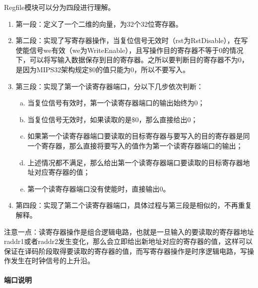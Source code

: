 Regfile模块可以分为四段进行理解。
\begin{enumerate}[(1)]
	\item 第一段：定义了一个二维的向量，为32个32位寄存器。
	
	\item 第二段：实现了写寄存器操作，当复位信号无效时（rst为RstDisable），在写使能信号we有效（we为WriteEnable），且写操作目的寄存器不等于0的情况下，可以将写输入数据保存到目的寄存器。之所以要判断目的寄存器不为0，是因为MIPS32架构规定$\$$0的值只能为0，所以不要写入。
	
	\item 第三段：实现了第一个读寄存器端口，分以下几步依次判断：
	
	\begin{enumerate}[(a)]
		\item 当复位信号有效时，第一个读寄存器端口的输出始终为0；
		
		\item 当复位信号无效时，如果读取的是$\$$0，那么直接给出0；
		
		\item 如果第一个读寄存器端口要读取的目标寄存器与要写入的目的寄存器是同一个寄存器，那么直接将要写入的值作为第一个读寄存器端口的输出；
		
		\item 上述情况都不满足，那么给出第一个读寄存器端口要读取的目标寄存器地址对应寄存器的值；
		
		\item 第一个读寄存器端口没有使能时，直接输出0。
	\end{enumerate}
	
	\item 第四段：实现了第二个读寄存器端口，具体过程与第三段是相似的，不再重复解释。
\end{enumerate}

注意一点：读寄存器操作是组合逻辑电路，也就是一旦输入的要读取的寄存器地址raddr1或者raddr2发生变化，那么会立即给出新地址对应的寄存器的值，这样可以保证在译码阶段取得要读取的寄存器的值，而写寄存器操作是时序逻辑电路，写操作发生在时钟信号的上升沿。

\paragraph{端口说明}
\quad

